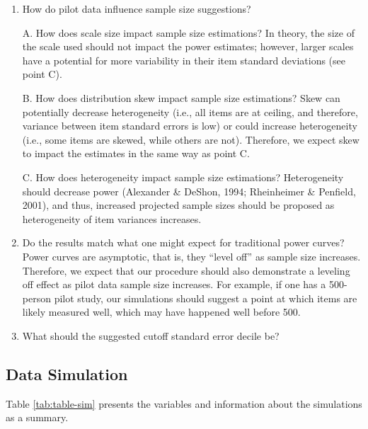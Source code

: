 \documentclass[
  man]{apa7}
\begin{document}
\begin{enumerate}
\def\labelenumi{\arabic{enumi})}
\item
  How do pilot data influence sample size suggestions?

  A. How does scale size impact sample size estimations? In theory, the size of the scale used should not impact the power estimates; however, larger scales have a potential for more variability in their item standard deviations (see point C).

  B. How does distribution skew impact sample size estimations? Skew can potentially decrease heterogeneity (i.e., all items are at ceiling, and therefore, variance between item standard errors is low) or could increase heterogeneity (i.e., some items are skewed, while others are not). Therefore, we expect skew to impact the estimates in the same way as point C.

  C. How does heterogeneity impact sample size estimations? Heterogeneity should decrease power (Alexander \& DeShon, 1994; Rheinheimer \& Penfield, 2001), and thus, increased projected sample sizes should be proposed as heterogeneity of item variances increases.
\item
  Do the results match what one might expect for traditional power curves? Power curves are asymptotic, that is, they ``level off'' as sample size increases. Therefore, we expect that our procedure should also demonstrate a leveling off effect as pilot data sample size increases. For example, if one has a 500-person pilot study, our simulations should suggest a point at which items are likely measured well, which may have happened well before 500.
\item
  What should the suggested cutoff standard error decile be?
\end{enumerate}

\hypertarget{data-simulation}{%
\subsection{Data Simulation}\label{data-simulation}}

Table \ref{tab:table-sim} presents the variables and information about the simulations as a summary.
\end{document}
